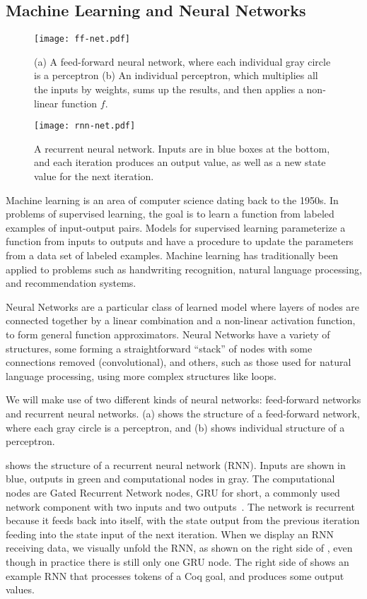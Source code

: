 \documentclass[sigplan,screen]{acmart}
\renewcommand{\>}{\quad}
\begin{document}
\subsection{Machine Learning and Neural Networks}

  \begin{figure}
    \texttt{[image: ff-net.pdf]}
    \caption{(a) A feed-forward neural network, where each individual gray circle is a
      perceptron (b) An individual perceptron, which multiplies all the inputs by weights, sums up the results, and then applies a non-linear function $f$.}
    \label{fig:ff}
  \end{figure}

  \begin{figure}
    \texttt{[image: rnn-net.pdf]}
    \caption{A recurrent neural network. Inputs are in blue boxes at
      the bottom, and each iteration produces an output value, as well
      as a new state value for the next iteration.}
    \label{fig:rnn}
  \end{figure}
Machine learning is an area of computer science dating back to the 1950s.
In problems of supervised learning,
  the goal is to learn a function from labeled examples of input-output pairs.
Models for supervised learning
  parameterize a function from inputs to outputs
  and have a procedure to update the parameters from a data set of labeled examples.
Machine learning has traditionally been applied to problems such as
  handwriting recognition, natural language processing, and recommendation systems.

Neural Networks are a particular class of learned model
  where layers of nodes are connected together
  by a linear combination and a non-linear activation function,
  to form general function approximators.
Neural Networks have a variety of structures,
  some forming a straightforward ``stack'' of nodes
  with some connections removed (convolutional),
  and others, such as those used for natural language processing,
  using more complex structures like loops.

We will make use of two different kinds of neural networks: feed-forward networks and recurrent neural networks.
(a) shows the structure of a feed-forward network, where each gray circle is a perceptron, and (b) shows individual structure of a perceptron.

 shows the structure of a recurrent neural network (RNN). Inputs are shown in blue, outputs in green and computational nodes in gray.
The computational nodes are Gated Recurrent Network nodes,
  GRU for short,
  a commonly used network component with two inputs and two outputs~\cite{gru}.
The network is recurrent because it feeds back into itself,
  with the state output from the previous iteration
  feeding into the state input of the next iteration.
When we display an RNN receiving data, we visually unfold the RNN, as shown on the right side of , even though in practice there is still only one GRU node.
The right side of  shows an example RNN that processes tokens of a Coq goal, and produces some output values.
\end{document}
